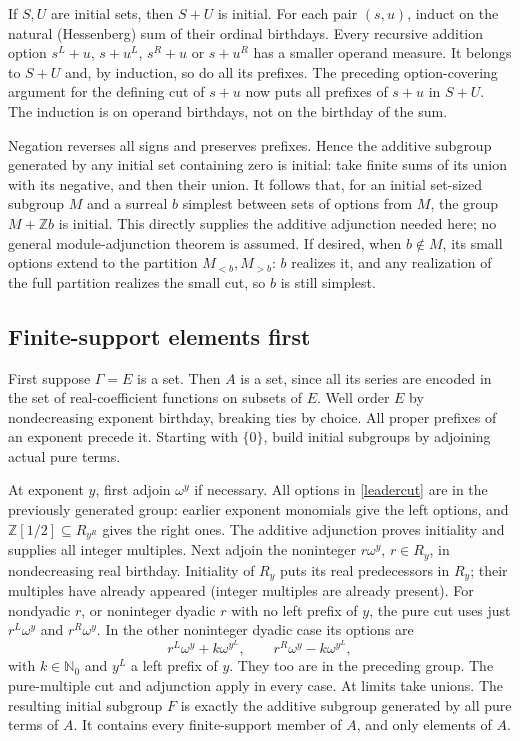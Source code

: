 \documentclass[11pt]{article}
\newcommand{\D}{\mathbb{Z}[1/2]}
\newcommand{\Z}{\mathbb{Z}}
\begin{document}
If $S,U$ are initial sets, then $S+U$ is initial. For each pair $(s,u)$,
induct on the natural (Hessenberg) sum of their ordinal birthdays.
Every recursive addition option $s^L+u$, $s+u^L$, $s^R+u$ or $s+u^R$
has a smaller operand measure. It belongs to $S+U$ and, by induction,
so do all its prefixes. The preceding option-covering argument for the
defining cut of $s+u$ now puts all prefixes of $s+u$ in $S+U$.
The induction is on operand birthdays, not on the birthday of the sum.

Negation reverses all signs and preserves prefixes. Hence the additive
subgroup generated by any initial set containing zero is initial:
take finite sums of its union with its negative, and then their union.
It follows that, for an initial set-sized subgroup $M$ and a surreal
$b$ simplest between sets of options from $M$, the group $M+\Z b$
is initial. This directly supplies the additive adjunction needed here;
no general module-adjunction theorem is assumed.
If desired, when $b\notin M$, its small options extend to the partition
$M_{<b},M_{>b}$: $b$ realizes it, and any realization of the full partition
realizes the small cut, so $b$ is still simplest.

\subsection{Finite-support elements first}
First suppose $\Gamma=E$ is a set. Then $A$ is a set, since all its series
are encoded in the set of real-coefficient functions on subsets of $E$.
Well order $E$ by nondecreasing exponent birthday, breaking ties by choice.
All proper prefixes of an exponent precede it.
Starting with $\{0\}$, build initial subgroups by adjoining actual pure terms.

At exponent $y$, first adjoin $\omega^y$ if necessary.
All options in \eqref{leadercut} are in the previously generated group:
earlier exponent monomials give the left options, and
$\D\subseteq R_{y^R}$ gives the right ones.
The additive adjunction proves initiality and supplies all integer
multiples. Next adjoin the noninteger $r\omega^y$, $r\in R_y$,
in nondecreasing real birthday. Initiality of $R_y$ puts its real
predecessors in $R_y$; their multiples have already appeared
(integer multiples are already present).
For nondyadic $r$, or noninteger dyadic $r$ with no left prefix of $y$,
the pure cut uses just $r^L\omega^y$ and $r^R\omega^y$.
In the other noninteger dyadic case its options are
\[
 r^L\omega^y+k\omega^{y^L},\qquad
 r^R\omega^y-k\omega^{y^L},
\]
with $k\in\mathbb N_0$ and $y^L$ a left prefix of $y$.
They too are in the preceding group.
The pure-multiple cut and adjunction apply in every case.
At limits take unions. The resulting initial subgroup $F$ is exactly
the additive subgroup generated by all pure terms of $A$.
It contains every finite-support member of $A$, and only elements of $A$.
\end{document}
